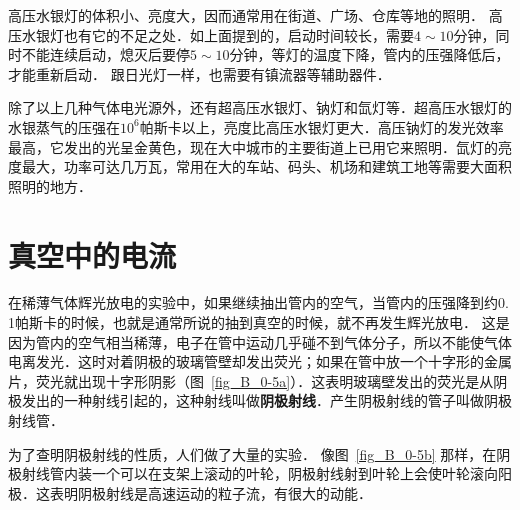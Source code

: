 高压水银灯的体积小、亮度大，因而通常用在街道、广场、仓库等地的照明．
高压水银灯也有它的不足之处．如上面提到的，启动时间较长，需要$4 \sim 10$分钟，同时不能连续启动，熄灭后要停$5 \sim 10$分钟，等灯的温度下降，管内的压强降低后，才能重新启动．
跟日光灯一样，也需要有镇流器等辅助器件．

除了以上几种气体电光源外，还有超高压水银灯、钠灯和氙灯等．超高压水银灯的水银蒸气的压强在$10^6$帕斯卡以上，亮度比高压水银灯更大．高压钠灯的发光效率最高，它发出的光呈金黄色，现在大中城市的主要街道上已用它来照明．氙灯的亮度最大，功率可达几万瓦，常用在大的车站、码头、机场和建筑工地等需要大面积照明的地方．

\section{真空中的电流}

在稀薄气体辉光放电的实验中，如果继续抽出管内的空气，当管内的压强降到约0. 1帕斯卡的时候，也就是通常所说的抽到真空的时候，就不再发生辉光放电．
这是因为管内的空气相当稀薄，电子在管中运动几乎碰不到气体分子，所以不能使气体电离发光．这时对着阴极的玻璃管壁却发出荧光；如果在管中放一个十字形的金属片，荧光就出现十字形阴影（图~\ref{fig_B_0-5a}）．这表明玻璃壁发出的荧光是从阴极发出的一种射线引起的，这种射线叫做\textbf{阴极射线}．产生阴极射线的管子叫做阴极射线管．

为了查明阴极射线的性质，人们做了大量的实验．
像图~\ref{fig_B_0-5b}  那样，在阴极射线管内装一个可以在支架上滚动的叶轮，阴极射线射到叶轮上会使叶轮滚向阳极．这表明阴极射线是高速运动的粒子流，有很大的动能．

